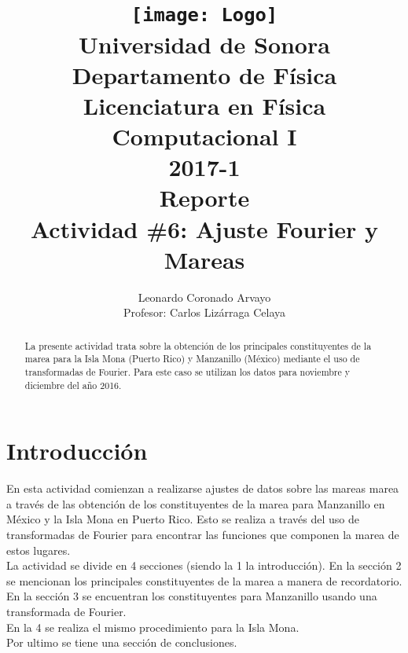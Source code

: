 \documentclass[12pt,letterpaper]{article}
\author{
Leonardo Coronado Arvayo\\
Profesor: Carlos Lizárraga Celaya   \vspace*{1.25in}}
\title{	\texttt{[image: Logo]} \\
Universidad de Sonora \\
{\small Departamento de Física \\
Licenciatura en Física \\
Computacional I \\
2017-1 \\
\vspace{0.55in} Reporte}\\ 
{\Huge Actividad \#6: Ajuste Fourier y Mareas}\\
\vspace*{1.0in}}
\begin{document}
	\maketitle
\newpage
	\tableofcontents
\pagebreak

\begin{abstract}


La presente actividad trata sobre la obtención de los principales constituyentes de la marea para la Isla Mona (Puerto Rico) y Manzanillo (México) mediante el uso de transformadas de Fourier. Para este caso se utilizan los datos para noviembre y diciembre del año 2016.


\end{abstract}


\section{Introducción}

En esta actividad comienzan a realizarse ajustes de datos sobre las mareas marea a través de las obtención de los constituyentes de la marea para Manzanillo en México y la Isla Mona en Puerto Rico. 
Esto se realiza a través del uso de transformadas de Fourier para encontrar las funciones que componen la marea de estos lugares.\\


La actividad se divide en 4 secciones (siendo la 1 la introducción). En la sección 2 se mencionan los principales constituyentes de la marea a manera de recordatorio.\\
En la sección 3 se encuentran los constituyentes para Manzanillo usando una transformada de Fourier. \\
En la 4 se realiza el mismo procedimiento para la Isla Mona.\\
Por ultimo se tiene una sección de conclusiones.\\
\end{document}
